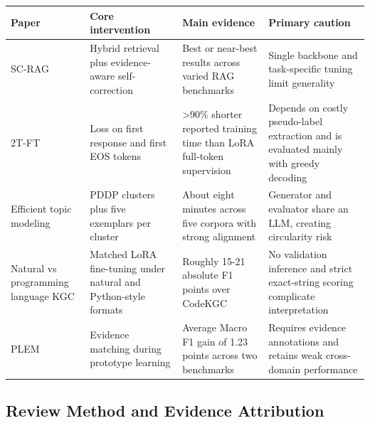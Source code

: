 \documentclass[11pt]{article}
\newcounter{none} %
\begin{document}
{\def\LTcaptype{none} %
\begin{longtable}[]{@{}
  >{\raggedright\arraybackslash}p{}
  >{\raggedright\arraybackslash}p{}
  >{\raggedright\arraybackslash}p{}
  >{\raggedright\arraybackslash}p{}@{}}
\toprule\noalign{}
\begin{minipage}[b]{\linewidth}\centering
\textbf{Paper}
\end{minipage} & \begin{minipage}[b]{\linewidth}\centering
\textbf{Core intervention}
\end{minipage} & \begin{minipage}[b]{\linewidth}\centering
\textbf{Main evidence}
\end{minipage} & \begin{minipage}[b]{\linewidth}\centering
\textbf{Primary caution}
\end{minipage} \\
\midrule\noalign{}
\endhead
\bottomrule\noalign{}
\endlastfoot
SC-RAG & Hybrid retrieval plus evidence-aware self-correction & Best or
near-best results across varied RAG benchmarks & Single backbone and
task-specific tuning limit generality \\
2T-FT & Loss on first response and first EOS tokens & \textgreater90\%
shorter reported training time than LoRA full-token supervision &
Depends on costly pseudo-label extraction and is evaluated mainly with
greedy decoding \\
Efficient topic modeling & PDDP clusters plus five exemplars per cluster
& About eight minutes across five corpora with strong alignment &
Generator and evaluator share an LLM, creating circularity risk \\
Natural vs programming language KGC & Matched LoRA fine-tuning under
natural and Python-style formats & Roughly 15-21 absolute F1 points over
CodeKGC & No validation inference and strict exact-string scoring
complicate interpretation \\
PLEM & Evidence matching during prototype learning & Average Macro F1
gain of 1.23 points across two benchmarks & Requires evidence
annotations and retains weak cross-domain performance \\
\end{longtable}
}

\subsection{Review Method and Evidence Attribution}\label{review-method-and-evidence-attribution}
\end{document}
